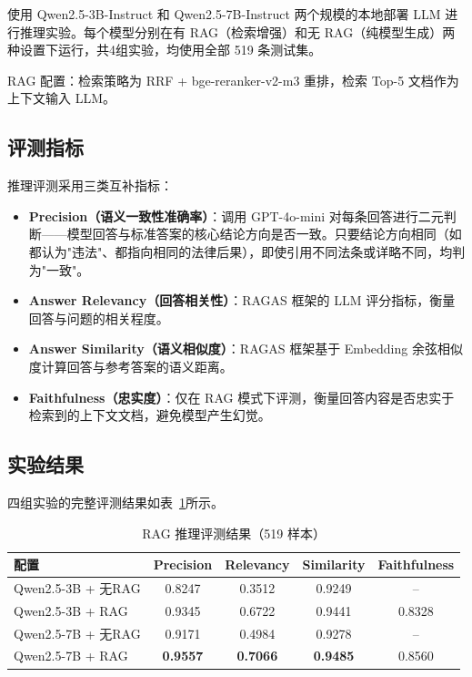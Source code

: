 \documentclass[12pt, a4paper]{article}
\begin{document}
使用 Qwen2.5-3B-Instruct 和 Qwen2.5-7B-Instruct 两个规模的本地部署 LLM 进行推理实验。每个模型分别在有 RAG（检索增强）和无 RAG（纯模型生成）两种设置下运行，共4组实验，均使用全部 519 条测试集。

RAG 配置：检索策略为 RRF + bge-reranker-v2-m3 重排，检索 Top-5 文档作为上下文输入 LLM。

\subsection{评测指标}

推理评测采用三类互补指标：

\begin{itemize}[leftmargin=2em]
    \item \textbf{Precision（语义一致性准确率）}：调用 GPT-4o-mini 对每条回答进行二元判断——模型回答与标准答案的核心结论方向是否一致。只要结论方向相同（如都认为"违法"、都指向相同的法律后果），即使引用不同法条或详略不同，均判为"一致"。
    \item \textbf{Answer Relevancy（回答相关性）}：RAGAS 框架的 LLM 评分指标，衡量回答与问题的相关程度。
    \item \textbf{Answer Similarity（语义相似度）}：RAGAS 框架基于 Embedding 余弦相似度计算回答与参考答案的语义距离。
    \item \textbf{Faithfulness（忠实度）}：仅在 RAG 模式下评测，衡量回答内容是否忠实于检索到的上下文文档，避免模型产生幻觉。
\end{itemize}

\subsection{实验结果}

四组实验的完整评测结果如表~\ref{tab:inference_results}所示。

\begin{table}[H]
\centering
\caption{RAG 推理评测结果（519 样本）}
\label{tab:inference_results}
\begin{tabular}{lcccc}
\toprule
\textbf{配置} & \textbf{Precision} & \textbf{Relevancy} & \textbf{Similarity} & \textbf{Faithfulness} \\
\midrule
Qwen2.5-3B + 无RAG & 0.8247 & 0.3512 & 0.9249 & -- \\
Qwen2.5-3B + RAG   & 0.9345 & 0.6722 & 0.9441 & 0.8328 \\
Qwen2.5-7B + 无RAG & 0.9171 & 0.4984 & 0.9278 & -- \\
Qwen2.5-7B + RAG   & \textbf{0.9557} & \textbf{0.7066} & \textbf{0.9485} & 0.8560 \\
\bottomrule
\end{tabular}
\end{table}
\end{document}
